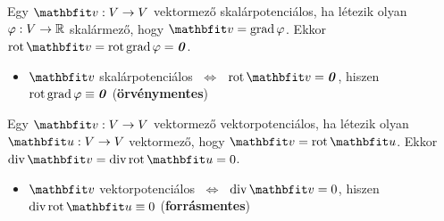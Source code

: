 \documentclass[fleqn]{szb-practice}
\begin{document}
\begin{blueBox}
\begin{itemize}
  \end{itemize}
\end{blueBox}

\begin{blueBox}
  Egy $\rvec v: V \rightarrow V$ vektormező skalárpotenciálos, ha létezik olyan
  $\varphi: V \rightarrow \mathbb{R}$ skalármező, hogy $\rvec v = \grad \varphi$.
  Ekkor $\rot \rvec v = \rot \grad \varphi = \nvec$.
  \begin{itemize}
    \item $\rvec v$ skalárpotenciálos
          $\;\Leftrightarrow\;$
          $\rot \rvec v = \nvec$,
          hiszen $\operatorname{rot} \operatorname{grad} \varphi \equiv \text{\textbf{\textit{0}}}$
          \hfill (\textbf{örvénymentes})
  \end{itemize}
  Egy $\rvec v: V \rightarrow V$ vektormező vektorpotenciálos, ha létezik olyan
  $\rvec u: V \rightarrow V$ vektormező, hogy $\rvec v = \rot \rvec u$.
  Ekkor $\Div \rvec v = \Div \rot \rvec u = 0$.
  \begin{itemize}
    \item $\rvec v$ vektorpotenciálos
          $\;\Leftrightarrow\;$
          $\Div \rvec v = 0$,
          hiszen $\Div \rot \rvec u \equiv 0$
          \hfill (\textbf{forrásmentes})
  \end{itemize}
\end{blueBox}
\end{document}
